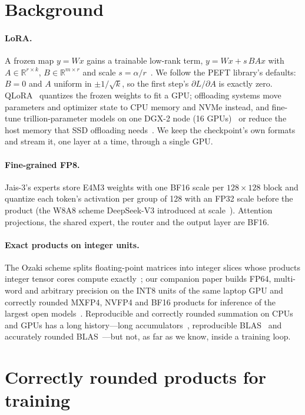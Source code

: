 \documentclass[11pt]{article}
\begin{document}
\section{Background}
\paragraph{LoRA.} A frozen map $y = W x$ gains a trainable low-rank term, $y = W x + s\, B A x$ with $A\in\mathbb{R}^{r\times
k}$, $B\in\mathbb{R}^{m\times r}$ and scale $s=\alpha/r$~\cite{hu21}. We follow the PEFT library's defaults: $B=0$ and $A$
uniform in $\pm1/\sqrt{k}$, so the first step's $\partial L/\partial A$ is exactly zero. QLoRA~\cite{qlora} quantizes the
frozen weights to fit a GPU; offloading systems move parameters and optimizer state to CPU memory and NVMe instead, and
fine-tune trillion-parameter models on one DGX-2 node (16 GPUs)~\cite{zeroinf} or reduce the host memory that SSD offloading
needs~\cite{memascend}. We keep the checkpoint's own formats and stream it, one layer at a time, through a single GPU.

\paragraph{Fine-grained FP8.} Jais-3's experts store E4M3 weights with one BF16 scale per $128\times128$ block and quantize
each token's activation per group of 128 with an FP32 scale before the product (the W8A8 scheme DeepSeek-V3 introduced at
scale~\cite{dsv3}). Attention projections, the shared expert, the router and the output layer are BF16.

\paragraph{Exact products on integer units.} The Ozaki scheme splits floating-point matrices into integer slices whose
products integer tensor cores compute exactly~\cite{ozaki2}; our companion paper builds FP64, multi-word and arbitrary
precision on the INT8 units of the same laptop GPU and correctly rounded MXFP4, NVFP4 and BF16 products for inference of the
largest open models~\cite{companion}. Reproducible and correctly rounded summation on CPUs and GPUs has a long history---long
accumulators~\cite{kulisch}, reproducible BLAS~\cite{reproblas,exblas} and accurately rounded BLAS~\cite{rareblas}---but
not, as far as we know, inside a training loop.

\section{Correctly rounded products for training}\label{sec:products}
\end{document}
